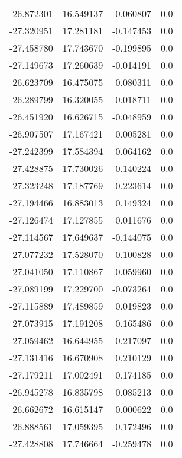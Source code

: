 \begin{tabular}{rrrr}
      -26.872301 &        16.549137 &    0.060807 &   0.0 \\
      -27.320951 &        17.281181 &   -0.147453 &   0.0 \\
      -27.458780 &        17.743670 &   -0.199895 &   0.0 \\
      -27.149673 &        17.260639 &   -0.014191 &   0.0 \\
      -26.623709 &        16.475075 &    0.080311 &   0.0 \\
      -26.289799 &        16.320055 &   -0.018711 &   0.0 \\
      -26.451920 &        16.626715 &   -0.048959 &   0.0 \\
      -26.907507 &        17.167421 &    0.005281 &   0.0 \\
      -27.242399 &        17.584394 &    0.064162 &   0.0 \\
      -27.428875 &        17.730026 &    0.140224 &   0.0 \\
      -27.323248 &        17.187769 &    0.223614 &   0.0 \\
      -27.194466 &        16.883013 &    0.149324 &   0.0 \\
      -27.126474 &        17.127855 &    0.011676 &   0.0 \\
      -27.114567 &        17.649637 &   -0.144075 &   0.0 \\
      -27.077232 &        17.528070 &   -0.100828 &   0.0 \\
      -27.041050 &        17.110867 &   -0.059960 &   0.0 \\
      -27.089199 &        17.229700 &   -0.073264 &   0.0 \\
      -27.115889 &        17.489859 &    0.019823 &   0.0 \\
      -27.073915 &        17.191208 &    0.165486 &   0.0 \\
      -27.059462 &        16.644955 &    0.217097 &   0.0 \\
      -27.131416 &        16.670908 &    0.210129 &   0.0 \\
      -27.179211 &        17.002491 &    0.174185 &   0.0 \\
      -26.945278 &        16.835798 &    0.085213 &   0.0 \\
      -26.662672 &        16.615147 &   -0.000622 &   0.0 \\
      -26.888561 &        17.059395 &   -0.172496 &   0.0 \\
      -27.428808 &        17.746664 &   -0.259478 &   0.0 \\

\end{tabular}
